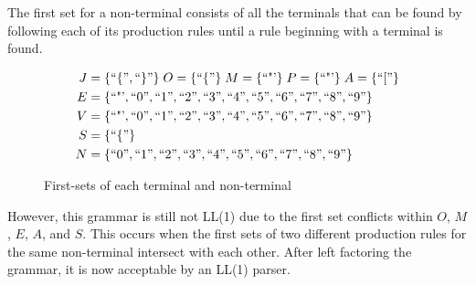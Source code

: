 \begin{definition}
    The first set for a non-terminal consists of all the terminals that can be found by following each of its production rules until a rule beginning with a terminal is found.
\end{definition}

\begin{figure}[H]
    \begin{center}
        \begin{equation}
            \begin{split}
                J &= \{``\{", ``\}"\}\;
                O = \{ ``\{" \}\;
                M = \{ \text{``"'} \}\;
                P = \{ \text{``"'} \}\;
                A = \{ ``[" \}\\
                E &= \{ \text{``"'}, ``0", ``1", ``2", ``3", ``4", ``5", ``6", ``7", ``8", ``9" \}\\
                V &= \{ \text{``"'}, ``0", ``1", ``2", ``3", ``4", ``5", ``6", ``7", ``8", ``9" \}\\
                S &= \{ ``\{" \}\\
                N &= \{``0", ``1", ``2", ``3", ``4", ``5", ``6", ``7", ``8", ``9" \}
            \end{split}
            \nonumber
        \end{equation}
    \end{center}
    \caption{\label{fig:3.8}First-sets of each terminal and non-terminal}
\end{figure}

However, this grammar is still not LL(1) due to the first set conflicts within $O$, $M$, $E$, $A$, and $S$. This occurs when the first sets of two different production rules for the same non-terminal intersect with each other. After left factoring the grammar, it is now acceptable by an LL(1) parser.

